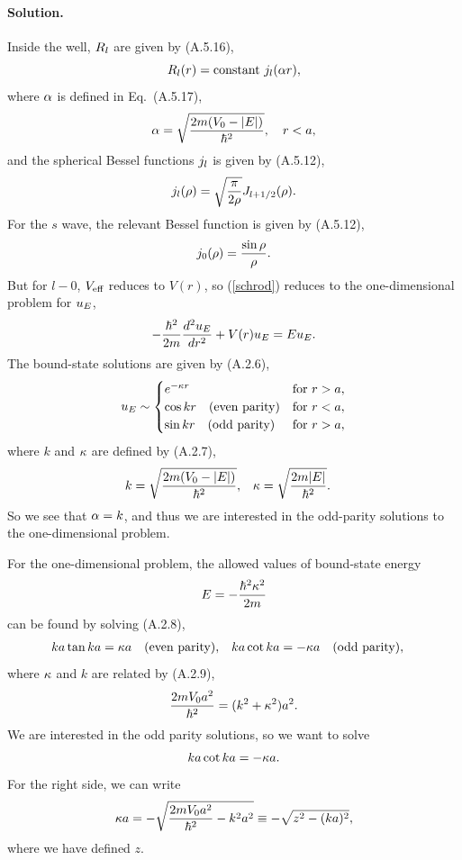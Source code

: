 \documentclass[11pt]{article}
\newcommand{\refeq}[1]{(\ref{#1})}
\newcommand{\beq}{\begin{equation*}}
\newcommand{\eeq}{\end{equation*}}
\newcommand{\beqn}{\begin{equation}}
\newcommand{\eeqn}{\end{equation}}
\newenvironment{solution}
{
	\paragraph{Solution.}
}
{
	\bigskip
}
\begin{document}
\begin{solution}
	Inside the well, $R_l$ are given by (A.5.16),
	\beq
		\Rl(r) = \constant \jl(\alp r),
	\eeq
	where $\alpha$ is defined in Eq.~(A.5.17),
	\beq
		\alp = \sqrt{\frac{2m (\Vo - \abs{E})}{\hbar^2}}, \quad r < a,
	\eeq
	and the spherical Bessel functions $j_l$ is given by (A.5.12),
	\begin{align*}
		j_l(\rho) = \sqrt{\frac{\pi}{2\rho}} J_{l + 1/2}(\rho).
	\end{align*}
	For the $s$ wave, the relevant Bessel function is given by (A.5.12),
	\beq
		\jo(\rho) = \frac{\sin\rho}{\rho}.
	\eeq
	But for $l - 0$, $V_{\text{eff}}$ reduces to $V(r)$, so \refeq{schrod} reduces to the one-dimensional problem for $u_E$,
	\beq
		-\frac{\hbar^2}{2m} \dv[2]{\uE}{r} + V(r) \uE = E \uE.
	\eeq
	The bound-state solutions are given by (A.2.6),
	\beq
		\uE \sim \begin{cases}
			e^{-\kap r} & \text{for } r > a, \\
			\cos kr \quad \text{(even parity)} & \text{for } r < a, \\
			\sin kr \quad \text{(odd parity)} & \text{for } r > a,
		\end{cases}
	\eeq
	where $k$ and $\kappa$ are defined by (A.2.7),
	\begin{align*}
		k &= \sqrt{\frac{2m (V_0 - \abs{E})}{\hbar^2}}, &
		\kappa &= \sqrt{\frac{2m \abs{E}}{\hbar^2}}.
	\end{align*}
	So we see that $\alpha = k$, and thus we are interested in the odd-parity solutions to the one-dimensional problem.
	
	For the one-dimensional problem, the allowed values of bound-state energy
	\beq
		E = -\frac{\hbar^2 \kap^2}{2m}
	\eeq
	can be found by solving (A.2.8),
	\begin{align*}
		k a \tan k a &= \kappa a \quad\text{(even parity)}, &
		k a \cot k a &= -\kappa a \quad\text{(odd parity)},
	\end{align*}
	where $\kappa$ and $k$ are related by (A.2.9),
	\beq
		\frac{2 m \Vo a^2}{\hbar^2} = (k^2 + \kap^2) a^2.
	\eeq
	We are interested in the odd parity solutions, so we want to solve
	\beqn \label{ka}
		k a \cot k a = -\kap a.
	\eeqn
	For the right side, we can write
	\beqn \label{kapa}
		\kap a = -\sqrt{\frac{2 m \Vo a^2}{\hbar^2} - k^2 a^2} \equiv -\sqrt{z^2 - (ka)^2},
	\eeqn
	where we have defined $z$.
	

\end{solution}
\end{document}
